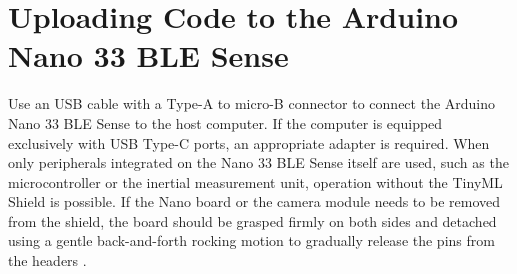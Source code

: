 \section{Uploading Code to the Arduino Nano 33 BLE Sense}

Use an USB cable with a Type-A to micro-B connector to connect the Arduino Nano 33 BLE Sense to the host computer. If the computer is equipped exclusively with USB Type-C ports, an appropriate adapter is required. When only peripherals integrated on the Nano 33 BLE Sense itself are used, such as the microcontroller or the inertial measurement unit, operation without the TinyML Shield is possible. If the Nano board or the camera module needs to be removed from the shield, the board should be grasped firmly on both sides and detached using a gentle back-and-forth rocking motion to gradually release the pins from the headers \cite{ICTP:2022}. 




%

